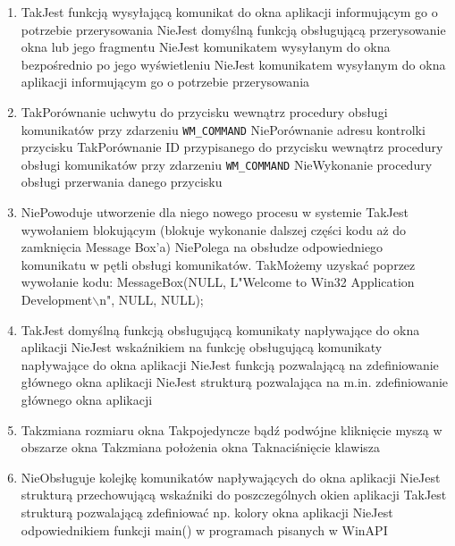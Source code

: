 \begin{enumerate}
	\newpage

	\item {}
	{Tak}{Jest funkcją wysyłającą komunikat do okna aplikacji informującym go o potrzebie przerysowania}
	{Nie}{Jest domyślną funkcją obsługującą przerysowanie okna lub jego fragmentu}
	{Nie}{Jest komunikatem wysyłanym do okna bezpośrednio po jego wyświetleniu}
	{Nie}{Jest komunikatem wysyłanym do okna aplikacji informującym go o potrzebie przerysowania}
	
	\item {}
	{Tak}{Porównanie uchwytu do przycisku wewnątrz procedury obsługi komunikatów przy zdarzeniu \texttt{WM\_COMMAND}}
	{Nie}{Porównanie adresu kontrolki przycisku}
	{Tak}{Porównanie ID przypisanego do przycisku wewnątrz procedury obsługi komunikatów przy zdarzeniu \texttt{WM\_COMMAND}}
	{Nie}{Wykonanie procedury obsługi przerwania danego przycisku}
	
	\item {}
	{Nie}{Powoduje utworzenie dla niego nowego procesu w systemie}
	{Tak}{Jest wywołaniem blokującym (blokuje wykonanie dalszej części kodu aż do zamknięcia Message Box'a)}
	{Nie}{Polega na obsłudze odpowiedniego komunikatu w pętli obsługi komunikatów.}
	{Tak}{Możemy uzyskać poprzez wywołanie kodu: MessageBox(NULL, L"Welcome to Win32 Application Development$\backslash$n", NULL, NULL);}
	
	\item {}
	{Tak}{Jest domyślną funkcją obsługującą komunikaty napływające do okna aplikacji}
	{Nie}{Jest wskaźnikiem na funkcję obsługującą komunikaty napływające do okna aplikacji}
	{Nie}{Jest funkcją pozwalającą na zdefiniowanie głównego okna aplikacji}
	{Nie}{Jest strukturą pozwalająca na m.in. zdefiniowanie głównego okna aplikacji}

	\item {}
	{Tak}{zmiana rozmiaru okna}
	{Tak}{pojedyncze bądź podwójne kliknięcie myszą w obszarze okna}
	{Tak}{zmiana położenia okna}
	{Tak}{naciśnięcie klawisza}
	
	\item {}
	{Nie}{Obsługuje kolejkę komunikatów napływających do okna aplikacji}
	{Nie}{Jest strukturą przechowującą wskaźniki do poszczególnych okien aplikacji}
	{Tak}{Jest strukturą pozwalającą zdefiniować np. kolory okna aplikacji}
	{Nie}{Jest odpowiednikiem funkcji main() w programach pisanych w WinAPI}
	
\end{enumerate}